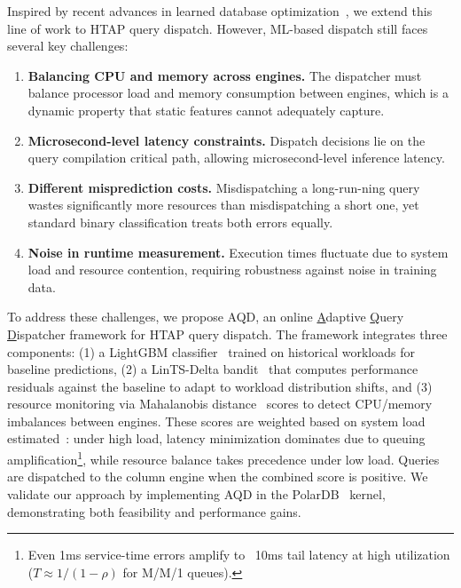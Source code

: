 \documentclass[sigconf, nonacm]{acmart}
\newcommand{\dispatcher}{AQD\xspace}
\begin{document}
Inspired by recent advances in learned database optimization~\cite{zhu2020flat, marcus2019neo, marcus2021bao, wu2025memq}, we extend this line of work to HTAP query dispatch. However, ML-based dispatch still faces several key challenges:


\begin{enumerate}[label=\textbf{C\arabic*.},
                  leftmargin=*,
                  labelwidth=1.6cm,  %
                  align=left,
                  labelsep=0.5em]    %
    \item \textbf{Balancing CPU and memory across engines.}  
          The dispatcher must balance processor load and memory consumption between engines, which is a dynamic property that static features cannot adequately capture.

    \item \textbf{Microsecond-level latency constraints.}  
          Dispatch decisions lie on the query compilation critical path, allowing microsecond-level inference latency.
          
    \item \textbf{Different misprediction costs.}  
          Misdispatching a long-run-ning query wastes significantly more resources than misdispatching a short one, yet standard binary classification treats both errors equally.

    \item \textbf{Noise in runtime measurement.}  
          Execution times fluctuate due to system load and resource contention, requiring robustness against noise in training data.
\end{enumerate}

To address these challenges, we propose \dispatcher, an online \underline{A}daptive \underline{Q}uery \underline{D}ispatcher framework for HTAP query dispatch. The framework integrates three components: (1) a LightGBM classifier~\cite{ke2017lightgbm} trained on historical workloads for baseline predictions, (2) a LinTS-Delta bandit~\cite{agrawal2013thompson} that computes performance residuals against the baseline to adapt to workload distribution shifts, and (3) resource monitoring via Mahalanobis distance~\cite{mclachlan1999mahalanobis} scores to detect CPU/memory imbalances between engines. These scores are weighted based on system load estimated~\cite{roberts2000control,hunter1986exponentially}: under high load, latency minimization dominates due to queuing amplification\footnote{Even 1ms service-time errors amplify to ~10ms tail latency at high utilization ($T \approx 1/(1-\rho)$ for M/M/1 queues).}, 
while resource balance takes precedence under low load. Queries are dispatched to the column engine when the combined score is positive. We validate our approach by implementing \dispatcher in the PolarDB~\cite{wang2023polardb} kernel, demonstrating both feasibility and performance gains.
\end{document}
